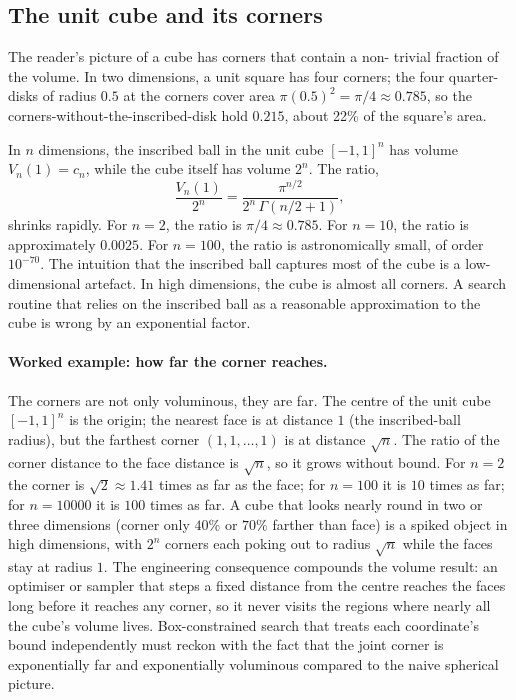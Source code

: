 \subsection{The unit cube and its corners}

The reader's picture of a cube has corners that contain a non-
trivial fraction of the volume. In two dimensions, a unit square
has four corners; the four quarter-disks of radius $0.5$ at the
corners cover area $\pi (0.5)^{2} = \pi/4 \approx 0.785$, so the
corners-without-the-inscribed-disk hold $0.215$, about 22\% of the
square's area.

In $n$ dimensions, the inscribed ball in the unit cube $[-1, 1]^{n}$
has volume $V_{n}(1) = c_{n}$, while the cube itself has volume
$2^{n}$. The ratio,
\[
\frac{V_{n}(1)}{2^{n}} = \frac{\pi^{n/2}}{2^{n}\,\Gamma(n/2 + 1)},
\]
shrinks rapidly. For $n = 2$, the ratio is $\pi / 4 \approx 0.785$.
For $n = 10$, the ratio is approximately $0.0025$. For $n = 100$,
the ratio is astronomically small, of order $10^{-70}$. The
intuition that the inscribed ball captures most of the cube is
a low-dimensional artefact. In high dimensions, the cube is almost
all corners. A search routine that relies on the inscribed ball as
a reasonable approximation to the cube is wrong by an exponential
factor.

\paragraph{Worked example: how far the corner reaches.} The corners are
not only voluminous, they are far. The centre of the unit cube
$[-1, 1]^{n}$ is the origin; the nearest face is at distance $1$ (the
inscribed-ball radius), but the farthest corner $(1, 1, \ldots, 1)$ is at
distance $\sqrt{n}$. The ratio of the corner distance to the face
distance is $\sqrt{n}$, so it grows without bound. For $n = 2$ the corner
is $\sqrt{2} \approx 1.41$ times as far as the face; for $n = 100$ it is
$10$ times as far; for $n = 10000$ it is $100$ times as far. A cube that
looks nearly round in two or three dimensions (corner only $40\%$ or
$70\%$ farther than face) is a spiked object in high dimensions, with
$2^{n}$ corners each poking out to radius $\sqrt{n}$ while the faces stay
at radius $1$. The engineering consequence compounds the volume result:
an optimiser or sampler that steps a fixed distance from the centre
reaches the faces long before it reaches any corner, so it never visits
the regions where nearly all the cube's volume lives. Box-constrained
search that treats each coordinate's bound independently must reckon with
the fact that the joint corner is exponentially far and exponentially
voluminous compared to the naive spherical picture.

